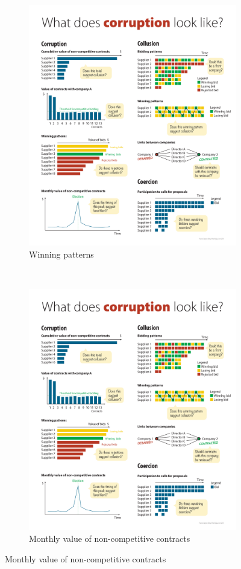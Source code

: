\begin{figure}[H]
\begin{subfigure}[t]{0.5\textwidth}
\end{subfigure}
~
\begin{subfigure}[t]{0.5\textwidth}
\caption{Winning patterns}
\includegraphics[max width=1\textwidth]{../img/poster_winning_patterns.pdf}
\end{subfigure}
~
\begin{subfigure}[t]{0.5\textwidth}
\caption{Monthly value of non-competitive contracts}
\includegraphics[max width=1\textwidth]{../img/poster_monthly.pdf}

\end{subfigure}
\end{figure}
